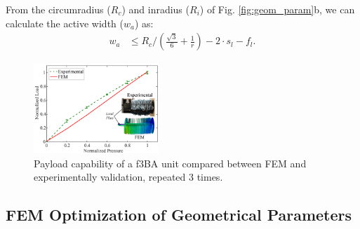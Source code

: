 \documentclass[letterpaper, 10 pt, conference]{ieeeconf}  %
\begin{document}
From the circumradius ($R_c$) and inradius ($R_i$) of Fig. \ref{fig:geom_param}b, we can calculate the active width ($w_a$) as:
\begin{align} 
w_a &\leq  R_c/(\frac{\sqrt{3}}{6} + \frac{1}{r}) - 2\cdot s_l -f_l \label{eq:wa_ha}.
\end{align}



\begin{figure}[b!]
\vspace*{-0.5cm}
\centering
\includegraphics[width=0.42\textwidth]{Figures/3CA_instron}
\caption{Payload capability of a f3BA unit compared between FEM and experimentally validation, repeated 3 times.}
% 
% 
\label{fig:f3CAs_load_fem_real}
\end{figure}


\subsection{FEM Optimization of Geometrical Parameters}


% 
% 
\end{document}
